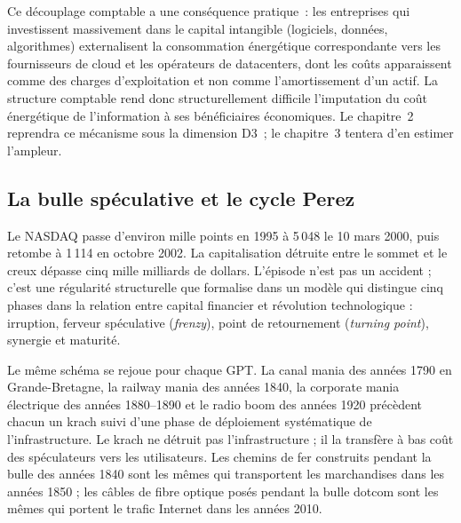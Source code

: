 %
Ce découplage comptable a une conséquence pratique~: les entreprises qui investissent massivement dans le capital intangible (logiciels, données, algorithmes) externalisent la consommation énergétique correspondante vers les fournisseurs de cloud et les opérateurs de datacenters, dont les coûts apparaissent comme des charges d'exploitation et non comme l'amortissement d'un actif. La structure comptable rend donc structurellement difficile l'imputation du coût énergétique de l'information à ses bénéficiaires économiques. Le chapitre~2 reprendra ce mécanisme sous la dimension D3~; le chapitre~3 tentera d'en estimer l'ampleur.

 
 
\subsection{La bulle spéculative et le cycle Perez}\label{subsec:dotcom}
 
Le NASDAQ passe d'environ mille points en 1995 à 5\,048 le 10 mars 2000, puis retombe à 1\,114 en octobre 2002. La capitalisation détruite entre le sommet et le creux dépasse cinq mille milliards de dollars. L'épisode n'est pas un accident ; c'est une régularité structurelle que \textcite{perez_technological_2002} formalise dans un modèle qui distingue cinq phases dans la relation entre capital financier et révolution technologique : irruption, ferveur spéculative (\emph{frenzy}), point de retournement (\emph{turning point}), synergie et maturité.
 
Le même schéma se rejoue pour chaque GPT. La canal mania des années 1790 en Grande-Bretagne, la railway mania des années 1840, la corporate mania électrique des années 1880--1890 et le radio boom des années 1920 précèdent chacun un krach suivi d'une phase de déploiement systématique de l'infrastructure. Le krach ne détruit pas l'infrastructure ; il la transfère à bas coût des spéculateurs vers les utilisateurs. Les chemins de fer construits pendant la bulle des années 1840 sont les mêmes qui transportent les marchandises dans les années 1850 ; les câbles de fibre optique posés pendant la bulle dotcom sont les mêmes qui portent le trafic Internet dans les années 2010.
 
